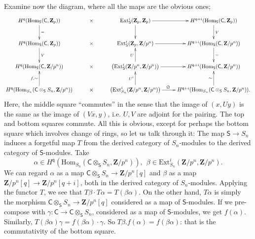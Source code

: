 \documentclass[10pt]{amsart}
\newcommand{\Z}{\mathbf{Z}}
\newcommand{\Ext}{\mathrm{Ext}}
\newcommand{\Hom}{\mathrm{Hom}}
\newcommand{\Cinf}{\mathsf{C}}
\newcommand{\Sinf}{\mathsf{S}}
\theoremstyle{remark}
\newcommand{\BWq}{\mathsf{q}}
\begin{document}
   Examine now the diagram, where all the maps are the obvious ones;
%
%
%
%
%
{\small     \begin{equation} \label{previousstory}
 \xymatrix{
 H^{\BWq}(\Hom_{\Sinf}(\Cinf, \Z_p))^{} \ar[d]^{=} & \times  &    \Ext^{i}_{\Sinf}(\Z_p, \Z_p)  \ar[d]  \ar[r] &  H^{\BWq+i}(\Hom_{\Sinf}(\Cinf, \Z_p)) \ar[d]^V \\
  H^{\BWq}(\Hom_{\Sinf}(\Cinf, \Z_p))   \ar[d]^{V}  & \times&  \Ext^{i}_{\Sinf}(\Z_p, \Z/p^n)    \ar[r]&   H^{\BWq+i}(\Hom_{\Sinf}(\Cinf,  \Z/p^n))\ar[d]^{=}\\
  H^{\BWq}(\Hom_{\Sinf}(\Cinf, \Z/p^n))^{}   & \times & \left( \Ext^{i}_{\Sinf}(\Z/p^n, \Z/p^n) \right) \ar[r]   \ar[u]^U  &  H^{\BWq+i}(\Hom_{\Sinf}(\Cinf, \Z/p^n))   \\
 H^{\BWq}(\Hom_{S_n}(\Cinf \otimes_{\Sinf} S_n, \Z/p^n))^{} \ar[u]^{f, \sim} & \times  &   \left( \Ext^{i}_{S_n}(\Z/p^n, \Z/p^n) \right) \ar[r]^{\mathfrak{Q} \ \  \ \ \ \ \ } \ar[u]^{U'} &  \ar[u]^{\sim} H^{\BWq+i}(\Hom_{S_n}(\Cinf \otimes_{\Sinf} S_n, \Z/p^n)). \\
  }
  \end{equation}
  }
Here, the middle square ``commutes'' in the sense that the image of $(x, Uy)$ is the same as the image
  of $(Vx, y)$, i.e. $U, V$ are adjoint for the pairing.  The top and bottom squares commute.   
  All this is obvious, except for perhaps the bottom square which involves change of rings, so let us talk through it: 
The map $\Sinf \rightarrow S_n$ induces a forgetful map $T$
from the derived category of
$S_n$-modules to the derived category of $\Sinf$-modules.  
Take $$\alpha \in H^{\BWq}(\Hom_{S_n}(\Cinf \otimes_{\Sinf} S_n, \Z/p^n)), \ \ \beta \in   \Ext^{i}_{S_n}(\Z/p^n, \Z/p^n).$$ 
We can regard $\alpha$ as a map $\Cinf \otimes_{\Sinf} S_n \rightarrow \Z/p^n[q]$
and $\beta$ as a map $\Z/p^n[q] \rightarrow \Z/p^n[q+i]$,  both in the derived category of $S_n$-modules.
Applying the functor $T$, we see that $T \beta \cdot T\alpha  = T(\beta \alpha)$. On the other hand,
$T \alpha$ is  simply the morphism
$\Cinf \otimes_{\Sinf} S_n \rightarrow \Z/p^n[q]$ considered as a map of $\Sinf$-modules.
If we pre-compose with $\gamma: \Cinf \rightarrow \Cinf \otimes_{\Sinf} S_n$, considered
as a map of $\Sinf$-modules, we get $f(\alpha)$. 
 Similarly, $  T(\beta \alpha) \gamma  = f(\beta \alpha) \cdot \gamma$.
So $T \beta . f(\alpha) = f(\beta \alpha)$: that is the  commutativity of the bottom square.
 
%
%
%
%
%
%
%
%
%
%
%
%
%
%
%
%
%
%
%
%
%
%
%
%
%
%
%
  
\end{document}
